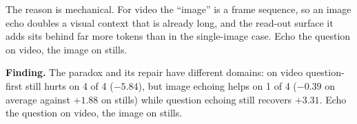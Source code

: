 The reason is mechanical. For video the ``image'' is a frame sequence, so an
image echo doubles a visual context that is already long, and the read-out
surface it adds sits behind far more tokens than in the single-image case. Echo
the question on video, the image on stills.

\begin{finding}
\textbf{Finding.} The paradox and its repair have different domains: on video
question-first still hurts on 4 of 4 ($-5.84$), but image echoing helps on 1 of
4 ($-0.39$ on average against $+1.88$ on stills) while question echoing still
recovers $+3.31$. Echo the question on video, the image on stills.
\end{finding}
